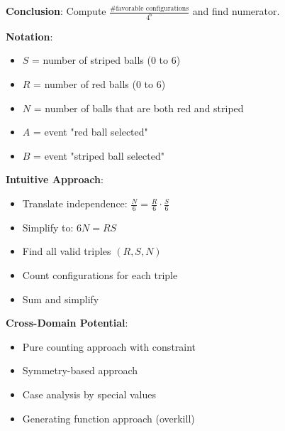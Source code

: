 \documentclass[12pt]{article}
\begin{document}
\begin{problemconfigbox}
\textbf{Conclusion}: Compute $\frac{\text{\# favorable configurations}}{4^6}$ and find numerator.

\textbf{Notation}:
\begin{itemize}
    \item $S$ = number of striped balls (0 to 6)
    \item $R$ = number of red balls (0 to 6)
    \item $N$ = number of balls that are both red and striped
    \item $A$ = event "red ball selected"
    \item $B$ = event "striped ball selected"
\end{itemize}

\textbf{Intuitive Approach}:
\begin{itemize}
    \item Translate independence: $\frac{N}{6} = \frac{R}{6} \cdot \frac{S}{6}$
    \item Simplify to: $6N = RS$
    \item Find all valid triples $(R, S, N)$
    \item Count configurations for each triple
    \item Sum and simplify
\end{itemize}

\textbf{Cross-Domain Potential}:
\begin{itemize}
    \item Pure counting approach with constraint
    \item Symmetry-based approach
    \item Case analysis by special values
    \item Generating function approach (overkill)
\end{itemize}

\end{problemconfigbox}
\end{document}
